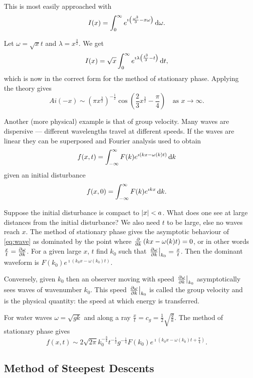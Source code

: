 \documentclass{notes}
\theoremstyle{plain}
\begin{document}
This is most easily approached with
\[
I(x) = \int_0^\infty e^{\imath \left(\frac{\omega^3}{3} - x \omega
\right)}\, \mathrm{d} \omega.
\]

Let $\omega = \sqrt{x} t$ and $\lambda = x^{\frac{3}{2}}$.  We get
\[
I(x) = \sqrt{x} \int_0^\infty e^{\imath \lambda \left( \frac{t^3}{3}
- t \right)} \, \mathrm{d} t,
\]
which is now in the correct form for the method of stationary phase.
Applying the theory gives
\[
Ai(-x) \sim \left( \pi x^{\frac{3}{2}} \right)^{-\frac{1}{2}}
\cos \left( \frac{2}{3} x^{\frac{3}{2}} - \frac{\pi}{4} \right)
\quad \text{as } x \to \infty.
\]

Another (more physical) example is that of group velocity.  Many waves are
dispersive --- different wavelengths travel at different speeds.  If the waves
are linear they can be superposed and Fourier analysis used to obtain
\begin{equation}\label{eq:wave}
f(x,t) = \int_{-\infty}^\infty F(k) e^{\imath \left(k x - \omega(k) t
\right)}\, \mathrm{d} k
\end{equation}
given an initial disturbance
\[
f(x,0) = \int_{-\infty}^\infty F(k) e^{\imath k x}\, \mathrm{d} k.
\]

Suppose the initial disturbance is compact to $\left|x\right| < a$.  What does one
see at large distances from the initial disturbance?  We also need $t$
to be large, else no waves reach $x$.  The method of stationary phase
gives the asymptotic behaviour of \eqref{eq:wave} as dominated by the point
where $\frac{\partial }{\partial k} \left( k x - \omega(k) t \right) = 0$, or in other
words $\frac{x}{t} = \frac{\partial \omega}{\partial k}$.  For a given large $x$, $t$ find
$k_0$ such that $\left.\frac{\partial \omega}{\partial k}\right|_{k_0}= \frac{x}{t}$.  Then the
dominant waveform is $F(k_0) e^{\imath \left(k_0 x - \omega(k_0) t \right)}$.

Conversely, given $k_0$ then an observer moving with speed
$\left.\frac{\partial \omega}{\partial k} \right|_{k_0}$ asymptotically sees waves of
wavenumber $k_0$.  This speed $\left.\frac{\partial \omega}{\partial k}\right|_{k_0}$ is called
the group velocity and is the physical quantity: the speed at which
energy is transferred.

For water waves $\omega = \sqrt{g k}$ and along a ray
$\frac{x}{t} = c_g = \frac{1}{2} \sqrt{\frac{g}{k}}$.  The method of
stationary phase gives
\[
f(x,t) \sim 2 \sqrt{2 \pi} k_0^{-\frac{3}{4}} t^{-\frac{1}{2}}
g^{-\frac{1}{4}} F(k_0) e^{\imath \left( k_0 x - \omega(k_0) t + \frac{\pi}{4}
\right)}.
\]

\subsection{Method of Steepest Descents}
\end{document}
